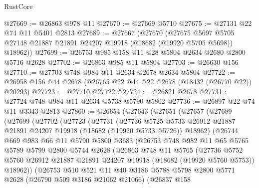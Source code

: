 \begin{lexlean}{RustCore}
\begin{coremodule}
@27669 := @26863 @978 @11
@27670 := @27669 @5710
@27675 := @27131 @22 @74 @11 @5401 @2813
@27689 := @27667
    (@27670
      (@27675 @5697 @5705 @27148 @21887 @21891 @24207 @19918 (@18682 (@19920 @5705 @5698)) @18962))
@27699 := @26753 @985 @158 @11 @28 @5804 @2634 @2680 @2800 @5716 @2628
@27702 := @26863 @985 @11 @5804
@27703 := @26630 @156
@27710 := @27703 @748 @984 @11 @2634 @2678 @2634 @5804
@27722 := @26958 @156 @44 @2678 (@26765 @22 @44 @22 @2678 (@18432 (@26770 @22)) @20293)
@27723 := @27710 @27722
@27724 := @26821 @2678
@27731 := @27724 @748 @984 @11 @2634 @5738 @5790 @5802
@27736 := @26897 @22 @74 @11 @3343 @2813
@27860 := @26654
    (@27643
      (@27651
        (@27657
          (@27689
            (@27699
              (@27702
                (@27723
                  (@27731
                    (@27736
                      @5725
                      @5733
                      @26912
                      @21887
                      @21891
                      @24207
                      @19918
                      (@18682 (@19920 @5733 @5726))
                      @18962)
                    (@26744
                      @669
                      @983
                      @66
                      @11
                      @5790
                      @5800
                      @3683
                      (@26753
                        @748
                        @982
                        @11
                        @65
                        @5765
                        @5789
                        @5799
                        @2800
                        @5744
                        @2628
                        (@26863
                          @748
                          @11
                          @5765
                          (@27736
                            @5752
                            @5760
                            @26912
                            @21887
                            @21891
                            @24207
                            @19918
                            (@18682 (@19920 @5760 @5753))
                            @18962))
                        (@26753
                          @510
                          @521
                          @11
                          @40
                          @3186
                          @5788
                          @5798
                          @2800
                          @5771
                          @2628
                          (@26790 @509 @3186 @21062 @21066)
                          (@26837
                            @158

\end{coremodule}
\end{lexlean}
